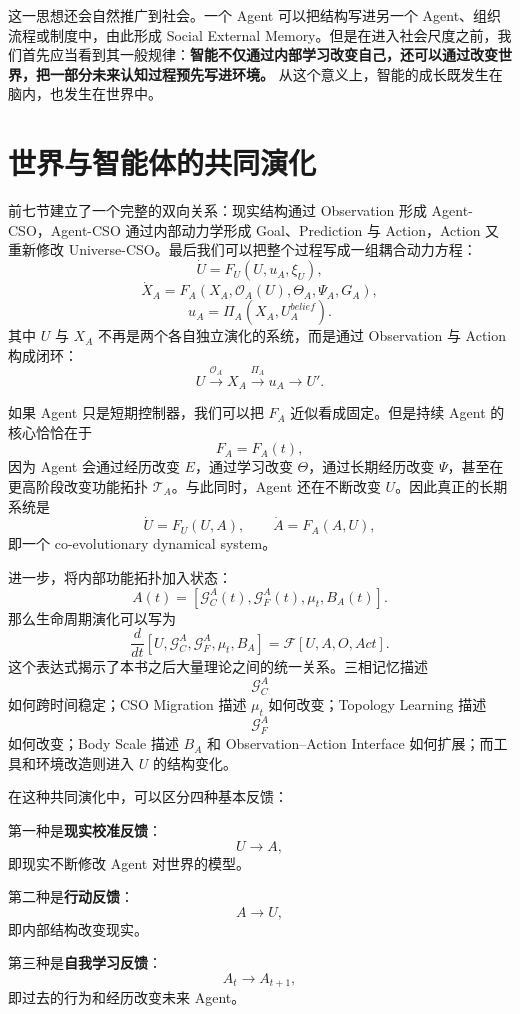 这一思想还会自然推广到社会。一个 Agent 可以把结构写进另一个 Agent、组织流程或制度中，由此形成 Social External Memory。但是在进入社会尺度之前，我们首先应当看到其一般规律：\textbf{智能不仅通过内部学习改变自己，还可以通过改变世界，把一部分未来认知过程预先写进环境。} 从这个意义上，智能的成长既发生在脑内，也发生在世界中。


\section{世界与智能体的共同演化}

前七节建立了一个完整的双向关系：现实结构通过 Observation 形成 Agent-CSO，Agent-CSO 通过内部动力学形成 Goal、Prediction 与 Action，Action 又重新修改 Universe-CSO。最后我们可以把整个过程写成一组耦合动力方程：
\[
\dot U
=
F_U
\left(
U,
u_A,
\xi_U
\right),
\]
\[
\dot X_A
=
F_A
\left(
X_A,
\mathcal O_A(U),
\Theta_A,
\Psi_A,
G_A
\right),
\]
\[
u_A
=
\Pi_A
\left(
X_A,U_A^{belief}
\right).
\]
其中 $U$ 与 $X_A$ 不再是两个各自独立演化的系统，而是通过 Observation 与 Action 构成闭环：
\[
\boxed{
U
\overset{\mathcal O_A}{\longrightarrow}
X_A
\overset{\Pi_A}{\longrightarrow}
u_A
\longrightarrow
U'.
}
\]

如果 Agent 只是短期控制器，我们可以把 $F_A$ 近似看成固定。但是持续 Agent 的核心恰恰在于
\[
F_A=F_A(t),
\]
因为 Agent 会通过经历改变 $E$，通过学习改变 $\Theta$，通过长期经历改变 $\Psi$，甚至在更高阶段改变功能拓扑 $\mathcal T_A$。与此同时，Agent 还在不断改变 $U$。因此真正的长期系统是
\[
\boxed{
\dot U=F_U(U,A),
\qquad
\dot A=F_A(A,U),
}
\]
即一个 co-evolutionary dynamical system。

进一步，将内部功能拓扑加入状态：
\[
A(t)
=
\left[
\mathcal G_C^A(t),
\mathcal G_F^A(t),
\mu_t,
B_A(t)
\right].
\]
那么生命周期演化可以写为
\[
\frac{d}{dt}
\left[
U,
\mathcal G_C^A,
\mathcal G_F^A,
\mu_t,
B_A
\right]
=
\mathcal F
\left[
U,
A,
O,
Act
\right].
\]
这个表达式揭示了本书之后大量理论之间的统一关系。三相记忆描述
\[
\mathcal G_C^A
\]
如何跨时间稳定；CSO Migration 描述 $\mu_t$ 如何改变；Topology Learning 描述
\[
\mathcal G_F^A
\]
如何改变；Body Scale 描述 $B_A$ 和 Observation--Action Interface 如何扩展；而工具和环境改造则进入 $U$ 的结构变化。

在这种共同演化中，可以区分四种基本反馈：

第一种是\textbf{现实校准反馈}：
\[
U
\rightarrow
A,
\]
即现实不断修改 Agent 对世界的模型。

第二种是\textbf{行动反馈}：
\[
A
\rightarrow
U,
\]
即内部结构改变现实。

第三种是\textbf{自我学习反馈}：
\[
A_t
\rightarrow
A_{t+1},
\]
即过去的行为和经历改变未来 Agent。

